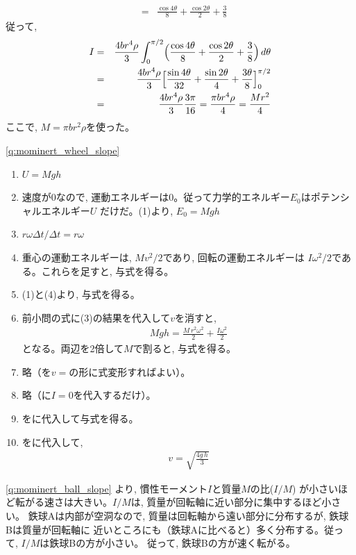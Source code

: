 \begin{q}
\begin{eqnarray}
             &=&\frac{\cos 4\theta}{8}+\frac{\cos2\theta}{2}+\frac{3}{8}
\end{eqnarray}
従って, 
\begin{eqnarray}
I&=&\frac{4br^4\rho}{3}\int_{0}^{\pi/2}\Bigl(\frac{\cos 4\theta}{8}+\frac{\cos2\theta}{2}+\frac{3}{8}\Bigr)\,d\theta\nonumber\\
 &=&\frac{4br^4\rho}{3}\Bigl[\frac{\sin 4\theta}{32}+\frac{\sin2\theta}{4}+\frac{3\theta}{8}\Bigr]_0^{\pi/2}\nonumber\\
 &=&\frac{4br^4\rho}{3}\frac{3\pi}{16}=\frac{\pi br^4\rho}{4}=\frac{Mr^2}{4}
\end{eqnarray}
ここで, $M=\pi b r^2 \rho$を使った。\mv

\ref{q:mominert_wheel_slope}
\begin{enumerate}
\item $U=Mgh$
\item 速度が0なので, 運動エネルギーは0。従って力学的エネルギー$E_0$はポテンシャルエネルギー$U$
だけだ。(1)より, $E_0=Mgh$
\item $r\omega\Delta t/\Delta t=r\omega$
\item 重心の運動エネルギーは, 
$Mv^2/2$であり, 回転の運動エネルギーは
$I\omega^2/2$である。これらを足すと, 与式を得る。
\item (1)と(4)より, 与式を得る。
\item 前小問の式に(3)の結果を代入して$v$を消すと, 
\begin{eqnarray}
Mgh=\frac{M\,r^2\omega^2}{2}+\frac{I\omega^2}{2}
\end{eqnarray}
となる。両辺を2倍して$M$で割ると, 与式を得る。
\item 略（を$v=$の形に式変形すればよい）。
\item 略（に$I=0$を代入するだけ）。
\item {}をに代入して与式を得る。
\item {}をに代入して, 
\begin{eqnarray}
v=\sqrt{\frac{4g\,h}{3}}
\end{eqnarray}
\end{enumerate}

\ref{q:mominert_ball_slope}
より, 慣性モーメント$I$と質量$M$の比($I/M$)
が小さいほど転がる速さは大きい。$I/M$は, 質量が回転軸に近い部分に集中するほど小さい。
鉄球Aは内部が空洞なので, 質量は回転軸から遠い部分に分布するが, 鉄球Bは質量が回転軸に
近いところにも（鉄球Aに比べると）多く分布する。従って, $I/M$は鉄球Bの方が小さい。
従って, 鉄球Bの方が速く転がる。\mv



\end{q}
